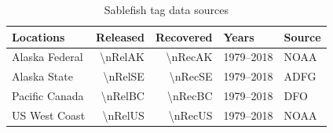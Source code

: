 \documentclass{article}
\begin{document}
\begin{table}[ht]
  \centering
  \caption{Sablefish tag data sources}
  \renewcommand\arraystretch{1.2}
  \label{tab:tag-data}
  \begin{tabular}{lrrll}
    \toprule
    \textbf{Locations} & \textbf{Released} & \textbf{Recovered} & \textbf{Years} & \textbf{Source} \\
    \midrule
    Alaska Federal & \num{\nRelAK} & \num{\nRecAK} & 1979--2018 & NOAA \\
    Alaska State & \num{\nRelSE} & \num{\nRecSE} & 1979--2018 & ADFG \\
    Pacific Canada & \num{\nRelBC} & \num{\nRecBC} & 1979--2018 & DFO \\
    US West Coast & \num{\nRelUS} & \num{\nRecUS} & 1979--2018 & NOAA \\
    \bottomrule
  \end{tabular}
\end{table}


\end{document}
